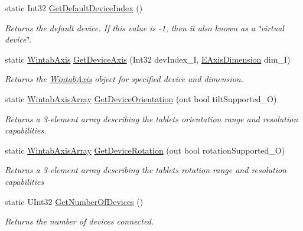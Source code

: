 \begin{DoxyCompactItemize}
static Int32 \mbox{\hyperlink{class_wintab_d_n_1_1_c_wintab_info_a2ca9dbcbb073bb443b57143868677cb4}{Get\+Default\+Device\+Index}} ()
\begin{DoxyCompactList}\small\item\em Returns the default device. If this value is -\/1, then it also known as a \char`\"{}virtual device\char`\"{}. \end{DoxyCompactList}\item 
static \mbox{\hyperlink{struct_wintab_d_n_1_1_wintab_axis}{Wintab\+Axis}} \mbox{\hyperlink{class_wintab_d_n_1_1_c_wintab_info_a589c0f32056f42944e7da7a096392fc2}{Get\+Device\+Axis}} (Int32 dev\+Index\+\_\+I, \mbox{\hyperlink{namespace_wintab_d_n_a38705aa38c49c04846399172fa9fd1cd}{E\+Axis\+Dimension}} dim\+\_\+I)
\begin{DoxyCompactList}\small\item\em Returns the \mbox{\hyperlink{struct_wintab_d_n_1_1_wintab_axis}{Wintab\+Axis}} object for specified device and dimension. \end{DoxyCompactList}\item 
static \mbox{\hyperlink{struct_wintab_d_n_1_1_wintab_axis_array}{Wintab\+Axis\+Array}} \mbox{\hyperlink{class_wintab_d_n_1_1_c_wintab_info_aa434ebb04517c6e7c8f85ece02b0b7dc}{Get\+Device\+Orientation}} (out bool tilt\+Supported\+\_\+O)
\begin{DoxyCompactList}\small\item\em Returns a 3-\/element array describing the tablet\textquotesingle{}s orientation range and resolution capabilities. \end{DoxyCompactList}\item 
static \mbox{\hyperlink{struct_wintab_d_n_1_1_wintab_axis_array}{Wintab\+Axis\+Array}} \mbox{\hyperlink{class_wintab_d_n_1_1_c_wintab_info_a8a7c68dbd64e532a45f7ad0d954e8771}{Get\+Device\+Rotation}} (out bool rotation\+Supported\+\_\+O)
\begin{DoxyCompactList}\small\item\em Returns a 3-\/element array describing the tablet\textquotesingle{}s rotation range and resolution capabilities \end{DoxyCompactList}\item 
static U\+Int32 \mbox{\hyperlink{class_wintab_d_n_1_1_c_wintab_info_aa99c66ea925e172021f179bb3248e3cd}{Get\+Number\+Of\+Devices}} ()
\begin{DoxyCompactList}\small\item\em Returns the number of devices connected. \end{DoxyCompactList}\item 

\end{DoxyCompactItemize}
